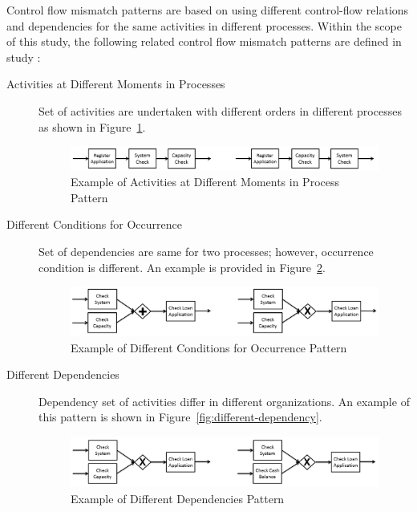 Control flow mismatch patterns are based on using different control-flow relations and dependencies for the same activities in different processes. Within the scope of this study, the following related control flow mismatch patterns are defined in study \cite{dijkman2007mismatch}:
\begin{description}
  \item[Activities at Different Moments in Processes] Set of activities are undertaken with different orders in different processes as shown in Figure~\ref{fig:different-moments}. 
      \begin{figure}
      \centering
      \includegraphics[width=\textwidth]{3_background/mismatch-patterns-different-moments}
      \caption{Example of Activities at Different Moments in Process Pattern}
      \label{fig:different-moments}
      \end{figure}
  \item[Different Conditions for Occurrence] Set of dependencies are same for two processes; however, occurrence condition is different. An example is provided in Figure~\ref{fig:different-conditions}.
      \begin{figure}
      \centering
      \includegraphics[width=\textwidth]{3_background/mismatch-patterns-different-conditions}
      \caption{Example of Different Conditions for Occurrence Pattern}
      \label{fig:different-conditions}
      \end{figure}
  \item[Different Dependencies] Dependency set of activities differ in different organizations. An example of this pattern is shown in Figure~\ref{fig:different-dependency}.
      \begin{figure}
      \centering
      \includegraphics[width=\textwidth]{3_background/mismatch-patterns-different-dependency}
      \caption{Example of Different Dependencies Pattern}

\end{figure}
\end{description}
